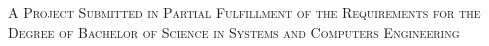 {
  \large
  \sffamily
  \textsc{A Project Submitted in Partial Fulfillment of the Requirements for the Degree of Bachelor of Science in Systems and Computers Engineering}
  \par
}